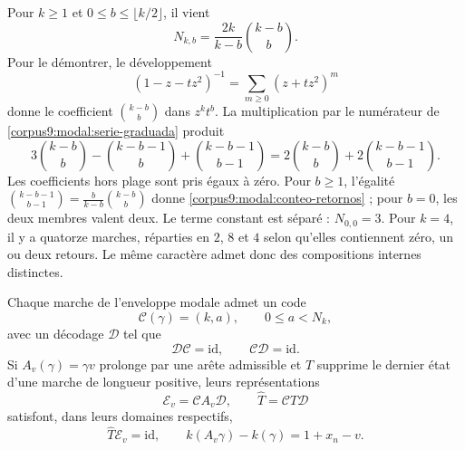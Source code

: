 Pour \(k\geq1\) et \(0\leq b\leq\lfloor k/2\rfloor\), il vient
\begin{equation}
 N_{k,b}=\frac{2k}{k-b}\binom{k-b}{b}.
 \label{corpus9:modal:conteo-retornos}
\end{equation}
Pour le démontrer, le développement
\[
 (1-z-tz^2)^{-1}=\sum_{m\geq0}(z+tz^2)^m
\]
donne le coefficient \(\binom{k-b}{b}\) dans \(z^kt^b\). La multiplication par le numérateur de \eqref{corpus9:modal:serie-graduada} produit
\[
 3\binom{k-b}{b}-\binom{k-b-1}{b}
   +\binom{k-b-1}{b-1}
 =2\binom{k-b}{b}+2\binom{k-b-1}{b-1}.
\]
Les coefficients hors plage sont pris égaux à zéro. Pour \(b\geq1\), l'égalité \(\binom{k-b-1}{b-1}=\frac{b}{k-b}\binom{k-b}{b}\) donne \eqref{corpus9:modal:conteo-retornos} ; pour \(b=0\), les deux membres valent deux. Le terme constant est séparé : \(N_{0,0}=3\). Pour \(k=4\), il y a quatorze marches, réparties en \(2\), \(8\) et \(4\) selon qu'elles contiennent zéro, un ou deux retours. Le même caractère admet donc des compositions internes distinctes.

\begin{proposition}
\label{corpus9:modal:recuperador}
Chaque marche de l'enveloppe modale admet un code
\[
 \mathcal C(\gamma)=(k,a),\qquad 0\leq a<N_k,
\]
avec un décodage \(\mathcal D\) tel que
\[
 \mathcal D\mathcal C=\mathrm{id},\qquad
 \mathcal C\mathcal D=\mathrm{id}.
\]
Si \(A_v(\gamma)=\gamma v\) prolonge par une arête admissible et
\(T\) supprime le dernier état d'une marche de longueur positive,
leurs représentations
\[
 \mathcal E_v=\mathcal C A_v\mathcal D,\qquad
 \widehat T=\mathcal C T\mathcal D
\]
satisfont, dans leurs domaines respectifs,
\begin{equation}
 \widehat T\mathcal E_v=\mathrm{id},\qquad
 k(A_v\gamma)-k(\gamma)=1+x_n-v.
 \label{corpus9:modal:transporte-codigos}
\end{equation}
\end{proposition}

